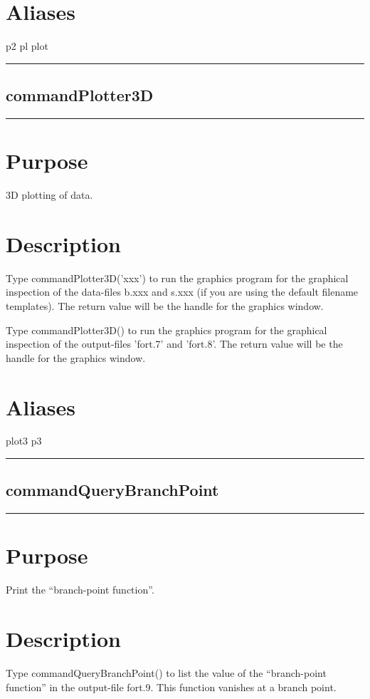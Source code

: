 \documentclass[12pt]{report}
\begin{document}
\begin{minipage}{6in}
    \section*{Aliases}
p2 pl plot \medskip\hrule\end{minipage}\subsection{commandPlotter3D} \label{sec:clui_ref_commandPlotter3D}\begin{minipage}{6in}\hrule\medskip\section*{Purpose}
3D plotting of data.\section*{Description}

    Type commandPlotter3D('xxx') to run the graphics program for the graphical
    inspection of the data-files b.xxx and s.xxx (if you are using the
    default filename templates).  The return value will be the handle
    for the graphics window.

    Type commandPlotter3D() to run the graphics program for the graphical
    inspection of the output-files 'fort.7' and 'fort.8'.  The return
    value will be the handle for the graphics window.
    \section*{Aliases}
plot3 p3 \medskip\hrule\end{minipage}\subsection{commandQueryBranchPoint} \label{sec:clui_ref_commandQueryBranchPoint}\begin{minipage}{6in}\hrule\medskip\section*{Purpose}
Print the ``branch-point function''.\section*{Description}
    
    Type commandQueryBranchPoint() to list the value of the ``branch-point function'' 
    in the output-file fort.9. This function vanishes at a branch point.
    

\end{minipage}
\end{document}
